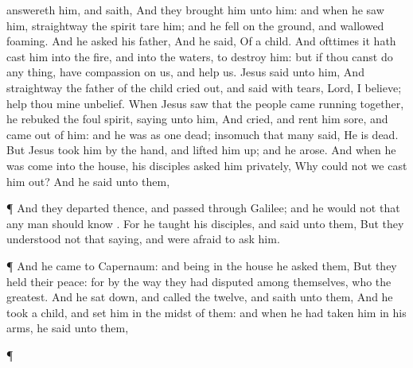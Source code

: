 {answereth
him,
and
saith,
{}
And they
brought
him
unto
him:
and when he
saw
him,
straightway the
spirit
tare
him;
and he
fell
on the
ground, and
wallowed
foaming.
And he
asked
his
father,
{}
And he
said, Of a
child.
And
ofttimes it hath
cast
him
into the
fire,
and
into the
waters,
to
destroy
him:
but
if thou canst
do any
thing, have
compassion
on
us, and
help
us.
Jesus
said unto
him,
{}
And
straightway the
father of the
child cried
out, and
said
with
tears,
Lord, I
believe; help
thou
mine
unbelief.
When
Jesus
saw
that the
people came running
together, he
rebuked
the
foul
spirit,
saying unto
him,
{}
And
{}
cried,
and
rent
him
sore, and came
out of him:
and he
was
as one
dead; insomuch
that
many
said, He is
dead.
But
Jesus
took
him by the
hand, and
lifted
him
up;
and he
arose.
And
when he was
come
into the
house,
his
disciples
asked
him
privately,
Why
could
not
we
cast
him
out?
And he
said unto
them,
{}
\par }{\PP {}¶
And they
departed
thence, and
passed
through
Galilee;
and he
would
not
that any
man should
know
{}.
For he
taught
his
disciples,
and
said unto
them,
{}
But
they understood
not that
saying,
and were
afraid to
ask
him.
\par }{\PP {}¶
And he
came
to
Capernaum:
and
being
in the
house he
asked
them,
{}
But
they held their
peace:
for
by the
way they had
disputed
among
themselves,
who
{} the
greatest.
And he sat
down, and
called the
twelve,
and
saith unto
them,
{}
And he
took a
child, and
set
him
in the
midst of
them:
and when he had
taken
him in his
arms, he
said unto
them,
\par }{\PP {}¶
}
